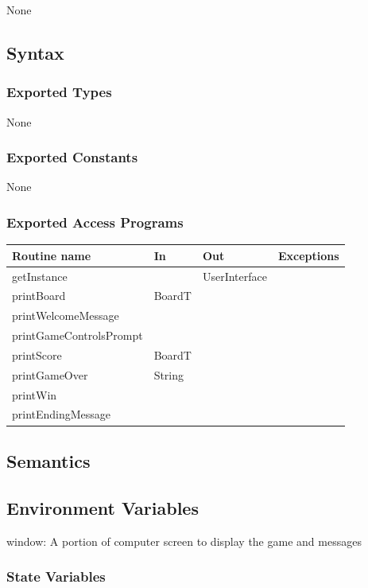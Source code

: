 \documentclass[12pt]{article}
\begin{document}
None

\subsection* {Syntax}

\subsubsection* {Exported Types}

None

\subsubsection* {Exported Constants}

None

\subsubsection* {Exported Access Programs}

\begin{tabular}{| l | l | l | p{6cm} |}
\hline
\textbf{Routine name} & \textbf{In} & \textbf{Out} & \textbf{Exceptions}\\
\hline
getInstance & ~ & UserInterface &  \\
\hline
printBoard & BoardT & ~ & \\
\hline
printWelcomeMessage & ~ & ~ & \\
\hline
printGameControlsPrompt & ~ & ~ & \\
\hline
printScore & BoardT & ~ & \\
\hline
printGameOver & String & ~ & \\
\hline
printWin & ~ & ~ & \\
\hline
printEndingMessage & ~ & ~ & \\
\hline
\end{tabular}

\subsection* {Semantics}

\subsection*{Environment Variables}

window: A portion of computer screen to display the game and messages

\subsubsection* {State Variables}
\end{document}
